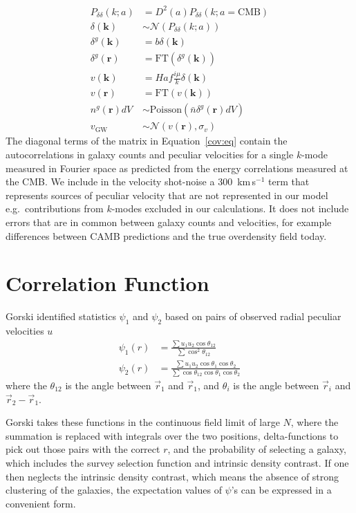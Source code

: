 \documentclass[11pt, oneside]{article}   	%
\begin{document}
\begin{align}
    P_{\delta \delta}(k; a) &= D^2(a) P_{\delta \delta}(k; a=\text{CMB})\\
    \delta(\mathbf{k}) & \sim \mathcal{N}\left(P_{\delta \delta}\left(k;a\right)\right)\\
    \delta^g(\mathbf{k}) & =b\delta(\mathbf{k}) \\
    \delta^g(\mathbf{r}) & =\text{FT}(\delta^g(\mathbf{k}))\\
    v(\mathbf{k}) & = Haf \frac{i\mu}{k} \delta(\mathbf{k})\\ 
    v(\mathbf{r}) & = \text{FT}(v(\mathbf{k}))\\
    n^g(\mathbf{r})dV &  \sim \text{Poisson}(\bar{n}\delta^g(\mathbf{r})dV)\\
    v_{\text{GW}} & \sim \mathcal{N}(v(\mathbf{r}),\sigma_v)
\end{align}
The diagonal terms of the matrix
in Equation~\ref{cov:eq} contain
the autocorrelations in
galaxy counts and peculiar velocities for a single $k$-mode
measured in Fourier space as
predicted
from the energy correlations measured
at the CMB.  We include in the velocity shot-noise a 300~km\,s$^{-1}$
term that represents sources
of peculiar velocity that are not represented in our model e.g.\ contributions
from  $k$-modes excluded
in our calculations.  It does not include errors
that are in common between galaxy
counts and velocities, for example
differences between CAMB predictions
and the true overdensity field today.

\section{Correlation Function}
Gorski identified statistics $\psi_1$ and $\psi_2$ based on pairs of observed radial peculiar velocities $u$
\begin{align}
\psi_1(r) & = \frac{\sum u_1 u_2 \cos{\theta_{12}}}{\sum \cos^2{\theta_{12}}} \\
\psi_2(r) & = \frac{\sum u_1 u_2 \cos{\theta_{1}}\cos{\theta_2}}{\sum \cos{\theta_{12} \cos{\theta_{1}} \cos{\theta_{2}}}} 
\end{align}
where the $\theta_{12}$ is the angle between $\vec{r}_1$ and $\vec{r}_1$, and $\theta_i$ is the angle between $\vec{r}_i$ and $\vec{r}_2-\vec{r}_1$.

Gorski takes these functions in the continuous field limit of large $N$, where the summation is replaced with integrals over the two positions,
delta-functions to pick out those pairs with the correct $r$, and the probability of selecting a galaxy, which includes the survey
selection function and intrinsic density contrast.  If one then neglects the intrinsic density contrast, which means the
absence of strong clustering of the galaxies, the expectation values
of $\psi$'s can be expressed in a convenient form.
\end{document}
